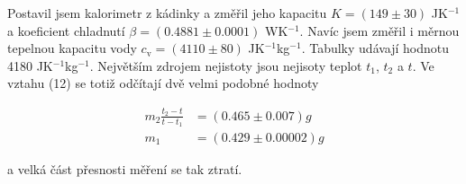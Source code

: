 \documentclass[a4paper,11pt]{article}
\begin{document}
Postavil jsem kalorimetr z kádinky a změřil jeho kapacitu $K = (149 \pm 30)$ JK$^{-1}$ a koeficient chladnutí $\beta = (0.4881 \pm 0.0001)$ WK$^{-1}$. Navíc jsem změřil i měrnou tepelnou kapacitu vody $c_{\text{v}} = (4110 \pm 80)$ JK$^{-1}$kg$^{-1}$. Tabulky udávají hodnotu 4180 JK$^{-1}$kg$^{-1}$. Největším zdrojem nejistoty jsou nejisoty teplot $t_1$, $t_2$ a $t$. Ve vztahu (12) se totiž odčítají dvě velmi podobné hodnoty 

\begin{align*}
  m_2 \frac{t_2 - t}{t - t_1} &= (0.465 \pm 0.007) g \\
  m_1 &= (0.429 \pm 0.00002) g
\end{align*}

\noindent
a velká část přesnosti měření se tak ztratí.
\end{document}
